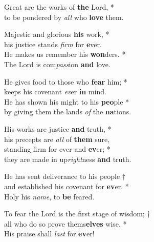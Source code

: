     Great are the works of \textbf{the} Lord, *\\
    to be pondered by \emph{all} who \textbf{love} them.

    Majestic and glorious \textbf{his} work, *\\
    his justice stands \emph{firm} for \textbf{e}ver.\\
    He makes us remember his \textbf{won}ders. *\\
    The Lord is com\emph{pass}ion \textbf{and} love.

    He gives food to those who \textbf{fear} him; *\\
    keeps his covenant \emph{ev}er \textbf{in} mind.\\
    He has shown his might to his \textbf{peo}ple *\\
    by giving them the lands \emph{of} the \textbf{na}tions.

    His works are justice \textbf{and} truth, *\\
    his precepts are \emph{all} of \textbf{them} sure,\\
    standing firm for ever and \textbf{ev}er; *\\
    they are made in up\emph{right}ness \textbf{and} truth.

    He has sent deliverance to his people †\\
    and established his covenant for \textbf{ev}er. *\\
    Holy his \emph{name}, to \textbf{be} feared.

    To fear the Lord is the first stage of wisdom; †\\
    all who do so prove thems\textbf{elves} wise. *\\
    His praise shall \emph{last} for \textbf{ev}er!

